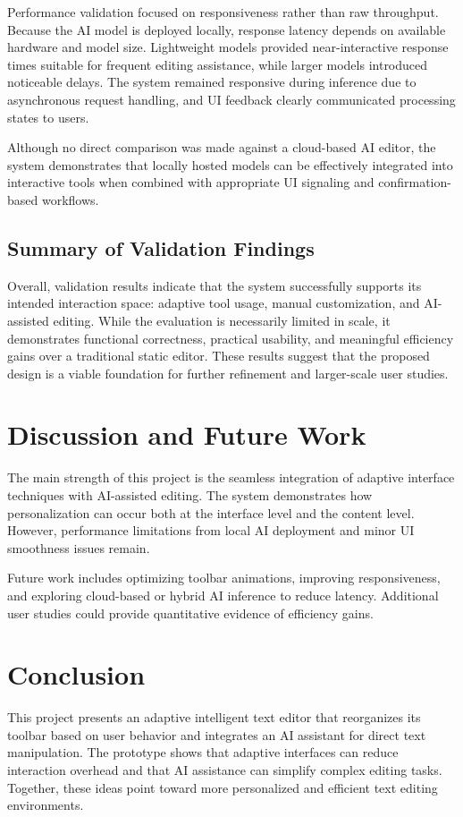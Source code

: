 \documentclass[sigconf]{acmart}
\begin{document}
Performance validation focused on responsiveness rather than raw throughput. Because the AI model is deployed locally, response latency depends on available hardware and model size. Lightweight models provided near-interactive response times suitable for frequent editing assistance, while larger models introduced noticeable delays. The system remained responsive during inference due to asynchronous request handling, and UI feedback clearly communicated processing states to users.

Although no direct comparison was made against a cloud-based AI editor, the system demonstrates that locally hosted models can be effectively integrated into interactive tools when combined with appropriate UI signaling and confirmation-based workflows.

\subsection{Summary of Validation Findings}

Overall, validation results indicate that the system successfully supports its intended interaction space: adaptive tool usage, manual customization, and AI-assisted editing. While the evaluation is necessarily limited in scale, it demonstrates functional correctness, practical usability, and meaningful efficiency gains over a traditional static editor. These results suggest that the proposed design is a viable foundation for further refinement and larger-scale user studies.

\section{Discussion and Future Work}
The main strength of this project is the seamless integration of adaptive interface techniques with AI-assisted editing. The system demonstrates how personalization can occur both at the interface level and the content level. However, performance limitations from local AI deployment and minor UI smoothness issues remain.

Future work includes optimizing toolbar animations, improving responsiveness, and exploring cloud-based or hybrid AI inference to reduce latency. Additional user studies could provide quantitative evidence of efficiency gains.

\section{Conclusion}
This project presents an adaptive intelligent text editor that reorganizes its toolbar based on user behavior and integrates an AI assistant for direct text manipulation. The prototype shows that adaptive interfaces can reduce interaction overhead and that AI assistance can simplify complex editing tasks. Together, these ideas point toward more personalized and efficient text editing environments.




\end{document}

